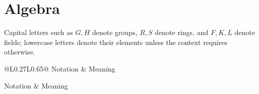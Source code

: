     \section*{Algebra}

    Capital letters such as $G,H$ denote groups, $R,S$ denote rings, and
    $F,K,L$ denote fields; lowercase letters denote their elements unless the
    context requires otherwise.

    \vspace{0.5em}

    {\small
    \renewcommand{\arraystretch}{1.18}
    \begin{longtable}{@{}L{0.27\textwidth}L{0.65\textwidth}@{}}
        \toprule
        Notation & Meaning \\
        \midrule
        \endfirsthead

        \toprule
        Notation & Meaning \\
        \midrule
        \endhead

        \bottomrule
        \endlastfoot


\end{longtable}}
